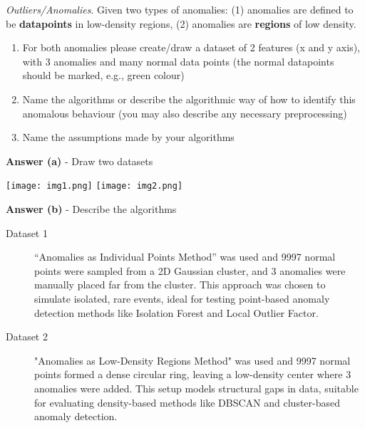 \documentclass[a4paper,10pt]{article}\setlength{\textheight}{10in}\setlength{\textwidth}{6.5in}\setlength{\topmargin}{-0.125in}\setlength{\oddsidemargin}{-.2in}\setlength{\evensidemargin}{-.2in}\setlength{\headsep}{0.2in}\setlength{\footskip}{0pt}\usepackage{amsmath}\usepackage{fancyhdr}\usepackage{enumitem}\usepackage{hyperref}\usepackage{xcolor}\usepackage{graphicx}\usepackage[export]{adjustbox}\usepackage{caption}\usepackage{float}\usepackage{booktabs}\usepackage{makecell}\pagestyle{fancy}
\begin{document}
\begin{enumerate}[topsep=0mm, partopsep=0mm, leftmargin=*]
\begin{itemize}
    \end{itemize}


{\color{blue}
\clearpage\item \textit{Outliers/Anomalies}. Given two types of anomalies: (1) anomalies are defined to be \textbf{datapoints} in low-density regions, (2) anomalies are \textbf{regions} of low density.
\begin{enumerate}
\item For both anomalies please create/draw a dataset of 2 features (x and y axis), with 3 anomalies and many normal data points (the normal datapoints should be marked, e.g., green colour)
\item Name the algorithms or describe the algorithmic way of how to identify this anomalous behaviour (you may also describe any necessary preprocessing)
\item Name the assumptions made by your algorithms
\end{enumerate}}




\textbf{Answer (a)} - Draw two datasets %
    \begin{center}
    \texttt{[image: img1.png]}
        \hspace{2cm}
    \texttt{[image: img2.png]}
    \end{center}


\textbf{Answer (b)} - Describe the algorithms 
\begin{description}
	\item[Dataset 1] ``Anomalies as Individual Points Method'' was used and 9997 normal points were sampled from a 2D Gaussian cluster, and 3 anomalies were manually placed far from the cluster. This approach was chosen to simulate isolated, rare events, ideal for testing point-based anomaly detection methods like Isolation Forest and Local Outlier Factor.
	\item[Dataset 2] "Anomalies as Low-Density Regions Method" was used and 9997 normal points formed a dense circular ring, leaving a low-density center where 3 anomalies were added. This setup models structural gaps in data, suitable for evaluating density-based methods like DBSCAN and cluster-based anomaly detection.
\end{description}



\end{enumerate}
\end{document}
